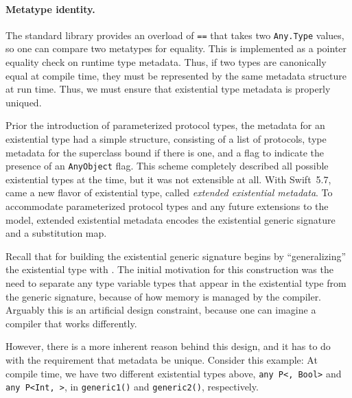 \documentclass[../generics]{subfiles}
\begin{document}
\paragraph{Metatype identity.}
The standard library provides an overload of \texttt{==} that takes two \texttt{Any.Type} values, so one can compare two metatypes for equality. This is implemented as a pointer equality check on runtime type metadata. Thus, if two types are canonically equal at compile time, they must be represented by the same metadata structure at run time. Thus, we must ensure that existential type metadata is properly uniqued.

Prior the introduction of parameterized protocol types, the metadata for an existential type had a simple structure, consisting of a list of protocols, type metadata for the superclass bound if there is one, and a flag to indicate the presence of an \texttt{AnyObject} flag. This scheme completely described all possible existential types at the time, but it was not extensible at all. With Swift~5.7, came a new flavor of existential type, called \emph{extended existential metadata}. To accommodate parameterized protocol types and any future extensions to the model, extended existential metadata encodes the existential generic signature and a substitution map.

Recall that  for building the existential generic signature begins by ``generalizing'' the existential type with . The initial motivation for this construction was the need to separate any type variable types that appear in the existential type from the generic signature, because of how memory is managed by the compiler. Arguably this is an artificial design constraint, because one can imagine a compiler that works differently.

However, there is a more inherent reason behind this design, and it has to do with the requirement that metadata be unique. Consider this example:
At compile time, we have two different existential types above,
\texttt{any P<\rT, Bool>} and
\texttt{any P<Int, \rT>}, in \texttt{generic1()} and \texttt{generic2()}, respectively.
\end{document}
